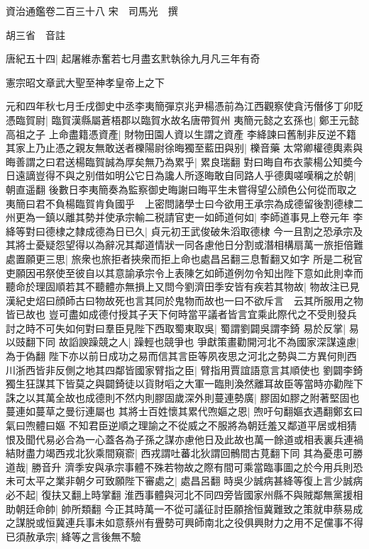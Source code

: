 資治通鑑卷二百三十八
宋　司馬光　撰

胡三省　音註

唐紀五十四|{
	起屠維赤奮若七月盡玄黓執徐九月凡三年有奇}


憲宗昭文章武大聖至神孝皇帝上之下

元和四年秋七月壬戌御史中丞李夷簡彈京兆尹楊憑前為江西觀察使貪汚僭侈丁卯貶憑臨賀尉|{
	臨賀漢縣屬蒼梧郡以臨賀水故名唐帶賀州}
夷簡元懿之玄孫也|{
	鄭王元懿高祖之子}
上命盡籍憑資產|{
	財物田園人資以生謂之資產}
李絳諫曰舊制非反逆不籍其家上乃止憑之親友無敢送者櫟陽尉徐晦獨至藍田與别|{
	櫟音藥}
太常卿權德輿素與晦善謂之曰君送楊臨賀誠為厚矣無乃為累乎|{
	累良瑞翻}
對曰晦自布衣蒙楊公知奬今日遠謫豈得不與之别借如明公它日為讒人所逐晦敢自同路人乎德輿嗟嘆稱之於朝|{
	朝直遥翻}
後數日李夷簡奏為監察御史晦謝曰晦平生未嘗得望公顔色公何從而取之夷簡曰君不負楊臨賀肯負國乎　上密問諸學士曰今欲用王承宗為成德留後割德棣二州更為一鎮以離其勢并使承宗輸二税請官吏一如師道何如|{
	李師道事見上卷元年}
李絳等對曰德棣之隸成德為日已久|{
	貞元初王武俊破朱滔取德棣}
今一且割之恐承宗及其將士憂疑怨望得以為辭况其鄰道情狀一同各慮他日分割或潛相構扇萬一旅拒倍難處置願更三思|{
	旅衆也旅拒者挾衆而拒上命也處昌呂翻三息暫翻又如字}
所是二税官吏願因弔祭使至彼自以其意諭承宗令上表陳乞如師道例勿令知出陛下意如此則幸而聽命於理固順若其不聽體亦無損上又問今劉濟田季安皆有疾若其物故|{
	物故注已見漢紀史炤曰顔師古曰物故死也言其同於鬼物而故也一曰不欲斥言　云其所服用之物皆已故也}
豈可盡如成德付授其子天下何時當平議者皆言宜乘此際代之不受則發兵討之時不可失如何對曰羣臣見陛下西取蜀東取吳|{
	蜀謂劉闢吳謂李錡}
易於反掌|{
	易以豉翻下同}
故謟諛躁競之人|{
	躁輕也競爭也}
爭獻策畫勸開河北不為國家深謀遠慮|{
	為于偽翻}
陛下亦以前日成功之易而信其言臣等夙夜思之河北之勢與二方異何則西川浙西皆非反側之地其四鄰皆國家臂指之臣|{
	臂指用賈誼語意言其順使也}
劉闢李錡獨生狂謀其下皆莫之與闢錡徒以貨財㗖之大軍一臨則渙然離耳故臣等當時亦勸陛下誅之以其萬全故也成德則不然内則膠固歲深外則蔓連勢廣|{
	膠固如膠之附著堅固也蔓連如蔓草之曼衍連屬也}
其將士百姓懷其累代喣嫗之恩|{
	喣吁句翻嫗衣遇翻鄭玄曰氣曰喣體曰嫗}
不知君臣逆順之理諭之不從威之不服將為朝廷羞又鄰道平居或相猜恨及聞代易必合為一心蓋各為子孫之謀亦慮他日及此故也萬一餘道或相表裏兵連禍結財盡力竭西戎北狄乘間窺窬|{
	西戎謂吐蕃北狄謂回鶻間古莧翻下同}
其為憂患可勝道哉|{
	勝音升}
濟季安與承宗事體不殊若物故之際有間可乘當臨事圖之於今用兵則恐未可太平之業非朝夕可致願陛下審處之|{
	處昌呂翻}
時吳少誠病甚絳等復上言少誠病必不起|{
	復扶又翻上時掌翻}
淮西事體與河北不同四旁皆國家州縣不與賊鄰無黨援相助朝廷命帥|{
	帥所類翻}
今正其時萬一不從可議征討臣願捨恒冀難致之策就申蔡易成之謀脱或恒冀連兵事未如意蔡州有舋勢可興師南北之役俱興財力之用不足儻事不得已須赦承宗|{
	絳等之言後無不驗}
